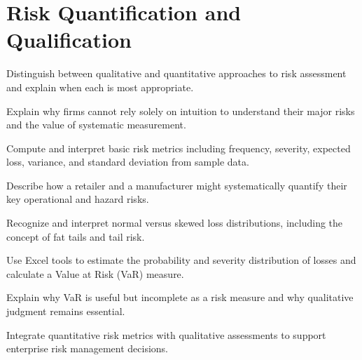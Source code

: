 \documentclass[11pt,openany]{book}
\begin{document}
\setcounter{chapter}{3}
\chapter{Risk Quantification and Qualification}
\label{chap:risk-quantification}

\begin{learningobjectives}
  \item Distinguish between qualitative and quantitative approaches to risk
        assessment and explain when each is most appropriate.
  \item Explain why firms cannot rely solely on intuition to understand their
        major risks and the value of systematic measurement.
  \item Compute and interpret basic risk metrics including frequency, severity,
        expected loss, variance, and standard deviation from sample data.
  \item Describe how a retailer and a manufacturer might systematically
        quantify their key operational and hazard risks.
  \item Recognize and interpret normal versus skewed loss distributions,
        including the concept of fat tails and tail risk.
  \item Use Excel tools to estimate the probability and severity distribution
        of losses and calculate a Value at Risk (VaR) measure.
  \item Explain why VaR is useful but incomplete as a risk measure and why
        qualitative judgment remains essential.
  \item Integrate quantitative risk metrics with qualitative assessments to
        support enterprise risk management decisions.
\end{learningobjectives}
\end{document}
